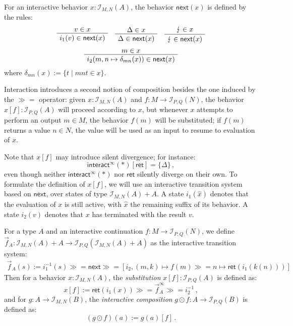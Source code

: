 \documentclass[acmsmall,timestamp,review]{acmart}
\newcommand{\kw}[1]{\ensuremath{ \mathsf{#1} }}
\newcommand{\bind}{\gg\!\!=}
\begin{document}
\begin{definition}
For an interactive behavior $x : \mathcal{I}_{M,N}(A)$,
the behavior $\kw{next}(x)$ is defined by the rules:
\begin{gather*}
    \AxiomC{$v \in x$}
    \UnaryInfC{$i_1(v) \in \kw{next}(x)$}
    \DisplayProof
    \quad
    \AxiomC{$\Delta \in x$}
    \UnaryInfC{$\Delta \in \kw{next}(x)$}
    \DisplayProof
    \quad
    \AxiomC{$\lightning \in x$}
    \UnaryInfC{$\lightning \in \kw{next}(x)$}
    \DisplayProof
    \\[1ex]
    \AxiomC{$m \in x$}
    \UnaryInfC{$i_2(m, n \mapsto \delta_{mn}(x)) \in \kw{next}(x)$}
    \DisplayProof
\end{gather*}
where $\delta_{mn}(x) := \{ t \mid mnt \in x \}$.
\end{definition}

Interaction introduces a second notion of composition
besides the one induced by the $\bind$ operator:
given
$x : \mathcal{I}_{M,N}(A)$ and
$f : M \rightarrow \mathcal{I}_{P,Q}(N)$,
the behavior $x[f] : \mathcal{I}_{P,Q}(A)$
will proceed according to $x$,
but whenever $x$ attempts to perform an output $m \in M$,
the behavior $f(m)$ will be substituted;
if $f(m)$ returns a value $n \in N$,
the value will be used as an input to resume to evaluation of $x$.

Note that $x[f]$ may introduce silent divergence;
for instance:
\[
    \kw{interact}^\infty(*) [\kw{ret}] = \{ \Delta \} \,,
\]
even though neither $\kw{interact}^\infty(*)$
nor $\kw{ret}$ silently diverge on their own.
To formulate the definition of $x[f]$,
we will use an interactive transition system
based on $\kw{next}$,
over states of type $\mathcal{I}_{M,N}(A) + A$.
A state $i_1(\hat{x})$ denotes that
the evaluation of $x$ is still active,
with $\hat{x}$ the remaining suffix of its behavior.
A state $i_2(v)$ denotes that
$x$ has terminated with the result $v$.

\begin{definition}[Substitution]
For a type $A$ and
an interactive continuation $f : M \rightarrow \mathcal{I}_{P,Q}(N)$,
we define
$\vec{f}_A : \mathcal{I}_{M,N}(A) + A \rightarrow
 \mathcal{I}_{P,Q}(\mathcal{I}_{M,N}(A) + A)$
as the interactive transition system:
\begin{align*}
  \vec{f}_A(s) := i_1^{-1}(s) \bind \kw{next} \bind
      [i_2, (m, k) \mapsto f(m) \bind n \mapsto \kw{ret}(i_1(k(n)))]
\end{align*}
Then for a behavior $x : \mathcal{I}_{M,N}(A)$,
the \emph{substitution} $x[f] : \mathcal{I}_{P,Q}(A)$ is defined as:
\[
    x[f] := \kw{ret}(i_1(x)) \bind \vec{f}_A^\infty \bind i_2^{-1} \,,
\]
and for $g : A \rightarrow \mathcal{I}_{M,N}(B)$,
the \emph{interactive composition}
$g \odot f : A \rightarrow \mathcal{I}_{P,Q}(B)$ is defined as:
\[
    (g \odot f)(a) := g(a) [f] \,.
\]
\end{definition}
\end{document}

